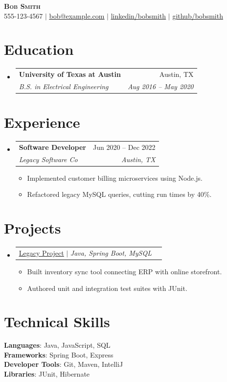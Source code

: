 \documentclass[letterpaper,11pt]{article}
\makeatletter
\newcommand{\resumeItem}[1]{
  \item\small{
    {#1 \vspace{-2pt}}
  }
}
\newcommand{\resumeSubheading}[4]{
  \vspace{-2pt}\item
    \begin{tabular*}{0.97\textwidth}[t]{l@{\extracolsep{\fill}}r}
      \textbf{#1} & #2 \\
      \textit{\small#3} & \textit{\small #4} \\
    \end{tabular*}\vspace{-7pt}
}
\newcommand{\resumeProjectHeading}[2]{
    \vspace{-2pt}\item
    \begin{tabular*}{0.97\textwidth}{l@{\extracolsep{\fill}}r}
      \small#1 & #2 \\
    \end{tabular*}\vspace{-7pt}
}
\newcommand{\resumeSubHeadingListStart}{\begin{itemize}[leftmargin=0.15in, label={}]}
\newcommand{\resumeSubHeadingListEnd}{\end{itemize}}
\newcommand{\resumeItemListStart}{\begin{itemize}}
\newcommand{\resumeItemListEnd}{\end{itemize}\vspace{-2pt}}
\makeatother
\begin{document}
\begin{center}
    \textbf{\Huge \scshape Bob Smith} \\ \vspace{1pt}
    \small 555-123-4567 $|$ \href{mailto:bob@example.com}{\underline{bob@example.com}} $|$ \href{https://linkedin.com/in/bobsmith}{\underline{linkedin/bobsmith}} $|$ \href{https://github.com/bobsmith}{\underline{github/bobsmith}}
\end{center}

\section{Education}
  \resumeSubHeadingListStart
    \resumeSubheading
      {University of Texas at Austin}{Austin, TX}
      {B.S. in Electrical Engineering}{Aug 2016 -- May 2020}
  \resumeSubHeadingListEnd

\section{Experience}
  \resumeSubHeadingListStart
    \resumeSubheading
      {Software Developer}{Jun 2020 -- Dec 2022}
      {Legacy Software Co}{Austin, TX}
      \resumeItemListStart
        \resumeItem{Implemented customer billing microservices using Node.js.}
        \resumeItem{Refactored legacy MySQL queries, cutting run times by 40\%.}
      \resumeItemListEnd
  \resumeSubHeadingListEnd

\section{Projects}
  \resumeSubHeadingListStart
    \resumeProjectHeading
      {\href{https://github.com/bobsmith/legacy-proj}{\underline{Legacy Project}} $|$ \emph{Java, Spring Boot, MySQL}}{}
      \resumeItemListStart
        \resumeItem{Built inventory sync tool connecting ERP with online storefront.}
        \resumeItem{Authored unit and integration test suites with JUnit.}
      \resumeItemListEnd
  \resumeSubHeadingListEnd

\section{Technical Skills}
 \begin{itemize}[leftmargin=0.15in, label={}]
    \small{\item{
     \textbf{Languages}{: Java, JavaScript, SQL} \\
     \textbf{Frameworks}{: Spring Boot, Express} \\
     \textbf{Developer Tools}{: Git, Maven, IntelliJ} \\
     \textbf{Libraries}{: JUnit, Hibernate}
    }}
 \end{itemize}
\end{document}
